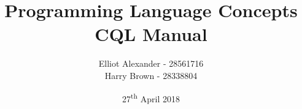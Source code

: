 \begin{titlepage}
\title{Programming Language Concepts \\ CQL Manual}
\author{Elliot Alexander - 28561716 \\ Harry Brown - 28338804}
\date{27\textsuperscript{th} April 2018}
\maketitle
\end{titlepage}

